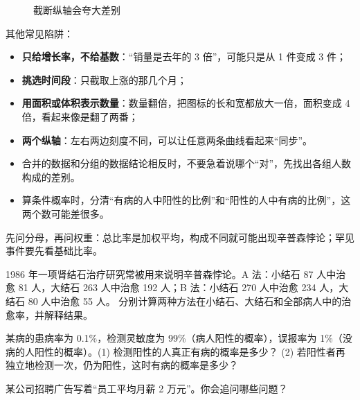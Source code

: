 \begin{figure}[!htbp]
\centering
{}
\qquad
{}
\caption{截断纵轴会夸大差别}
\label{fig:es-axis}
\end{figure}

其他常见陷阱：
\begin{itemize}
  \item \textbf{只给增长率，不给基数}：“销量是去年的 3 倍”，可能只是从 1 件变成 3 件；
  \item \textbf{挑选时间段}：只截取上涨的那几个月；
  \item \textbf{用面积或体积表示数量}：数量翻倍，把图标的长和宽都放大一倍，面积变成 4 倍，看起来像是翻了两番；
  \item \textbf{两个纵轴}：左右两边刻度不同，可以让任意两条曲线看起来“同步”。
\end{itemize}

\begin{pitfall}
\begin{itemize}
  \item 合并的数据和分组的数据结论相反时，不要急着说哪个“对”，先找出各组人数构成的差别。
  \item 算条件概率时，分清“有病的人中阳性的比例”和“阳性的人中有病的比例”，这两个数可能差很多。
\end{itemize}
\end{pitfall}

\begin{oneline}
先问分母，再问权重：总比率是加权平均，构成不同就可能出现辛普森悖论；罕见事件要先看基础比率。
\end{oneline}

\begin{exercises}[练一练]
  \item 1986 年一项肾结石治疗研究常被用来说明辛普森悖论。A 法：小结石 87 人中治愈 81 人，大结石 263 人中治愈 192 人；B 法：小结石 270 人中治愈 234 人，大结石 80 人中治愈 55 人。
        分别计算两种方法在小结石、大结石和全部病人中的治愈率，并解释结果。
  \item 某病的患病率为 0.1\%，检测灵敏度为 99\%（病人阳性的概率），误报率为 1\%（没病的人阳性的概率）。(1) 检测阳性的人真正有病的概率是多少？
        (2) 若阳性者再独立地检测一次，仍为阳性，这时有病的概率是多少？
  \item 某公司招聘广告写着“员工平均月薪 2 万元”。你会追问哪些问题？
\end{exercises}
